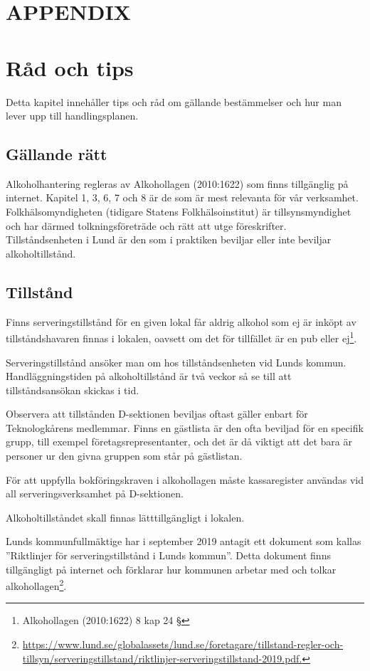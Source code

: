 \documentclass[]{dsekprotokoll}
\begin{document}
\section*{APPENDIX}
\section{Råd och tips}
Detta kapitel innehåller tips och råd om gällande bestämmelser och hur man lever upp till
handlingsplanen.

\subsection{Gällande rätt}
Alkoholhantering regleras av Alkohollagen (2010:1622) som finns tillgänglig på internet.
Kapitel 1, 3, 6, 7 och 8 är de som är mest relevanta för vår verksamhet. Folkhälsomyndigheten (tidigare Statens Folkhälsoinstitut) är tillsynsmyndighet och har därmed tolkningsföreträde och rätt att utge föreskrifter. Tillståndsenheten i Lund är den som i praktiken beviljar eller inte beviljar alkoholtillstånd.

\subsection{Tillstånd}
Finns serveringstillstånd för en given lokal får aldrig alkohol som ej är inköpt av tillståndshavaren finnas i lokalen, oavsett om det för tillfället är en pub eller ej\footnote{Alkohollagen (2010:1622) 8 kap 24 §}.

Serveringstillstånd ansöker man om hos tillståndsenheten vid Lunds kommun. Handläggningstiden på alkoholtillstånd är två veckor så se till att tillståndsansökan skickas i tid.

Observera att tillstånden D-sektionen beviljas oftast gäller enbart för Teknologkårens medlemmar. Finns en gästlista är den ofta beviljad för en specifik grupp, till exempel företagsrepresentanter, och det är då viktigt att det bara är personer ur den givna gruppen som står på gästlistan.

För att uppfylla bokföringskraven i alkohollagen måste kassaregister användas vid all
serveringsverksamhet på D-sektionen.

Alkoholtillståndet skall finnas lätttillgängligt i lokalen.

Lunds kommunfullmäktige har i september 2019 antagit ett dokument som kallas ''Riktlinjer för serveringstillstånd i Lunds kommun''. Detta dokument finns tillgängligt på internet och förklarar hur kommunen arbetar med och tolkar alkohollagen\footnote{\url{https://www.lund.se/globalassets/lund.se/foretagare/tillstand-regler-och-
        tillsyn/serveringstillstand/riktlinjer-serveringstillstand-2019.pdf.}
}.
\end{document}
